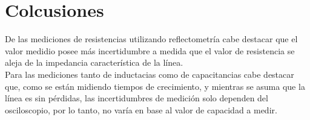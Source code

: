 \documentclass[a4paper,10pt]{article}
\begin{document}
	\newpage
	\section{Colcusiones}
	\indent De las mediciones de resistencias utilizando reflectometría cabe 
	destacar que el valor medidio posee más incertidumbre a medida que el 
	valor de resistencia se aleja de la impedancia característica de la línea.
	\\
	\indent Para las mediciones tanto de inductacias como de capacitancias 
	cabe destacar que, como se están midiendo tiempos de crecimiento, y 
	mientras se	asuma que la línea es sin pérdidas, las incertidumbres de 
	medición solo dependen del osciloscopio, por lo tanto, no varía en base al
	valor de capacidad a medir.\\
\end{document}
